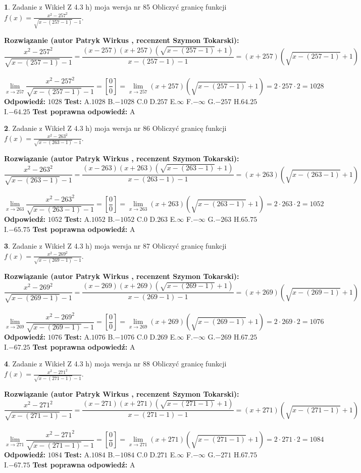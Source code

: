 \documentclass[12pt, a4paper]{article}
\theoremstyle{definition} %
\newtheorem{zad}{}
\newcommand{\zadStart}[1]{\begin{zad}#1\newline}
\newcommand{\zadStop}{\end{zad}}
\newcommand{\rozwStart}[2]{\noindent \textbf{Rozwiązanie (autor #1 , recenzent #2): }\newline}
\newcommand{\rozwStop}{\newline}
\newcommand{\odpStart}{\noindent \textbf{Odpowiedź:}\newline}
\newcommand{\odpStop}{\newline}
\newcommand{\testStart}{\noindent \textbf{Test:}\newline}
\newcommand{\testStop}{\newline}
\newcommand{\kluczStart}{\noindent \textbf{Test poprawna odpowiedź:}\newline}
\newcommand{\kluczStop}{\newline}
\begin{document}
\zadStart{Zadanie z Wikieł Z 4.3 h) moja wersja nr 85}
Obliczyć granicę funkcji $f(x)=\frac{x^{2} - 257^{2}}{\sqrt{x-(257-1)}-1}$.
\zadStop
\rozwStart{Patryk Wirkus}{Szymon Tokarski}
$$\frac{x^{2} - 257^{2}}{\sqrt{x-(257-1)}-1}=\frac{(x-257)(x+257)(\sqrt{x-(257-1)}+1)}{x-(257-1)-1}=(x+257)(\sqrt{x-(257-1)}+1)$$
\\
$$\lim\limits_{x\to 257}\frac{x^{2} - 257^{2}}{\sqrt{x-(257-1)}-1}=[\frac{0}{0}]=
\lim\limits_{x\to 257}(x+257)(\sqrt{x-(257-1)}+1) = 2\cdot257 \cdot 2 = 1028$$
\rozwStop
\odpStart
$1028$
\odpStop
\testStart
A.$1028$
B.$-1028$
C.$0$
D.$257$
E.$\infty$
F.$-\infty$
G.$-257$
H.$64.25$
I.$-64.25$
\testStop
\kluczStart
A
\kluczStop



\zadStart{Zadanie z Wikieł Z 4.3 h) moja wersja nr 86}
Obliczyć granicę funkcji $f(x)=\frac{x^{2} - 263^{2}}{\sqrt{x-(263-1)}-1}$.
\zadStop
\rozwStart{Patryk Wirkus}{Szymon Tokarski}
$$\frac{x^{2} - 263^{2}}{\sqrt{x-(263-1)}-1}=\frac{(x-263)(x+263)(\sqrt{x-(263-1)}+1)}{x-(263-1)-1}=(x+263)(\sqrt{x-(263-1)}+1)$$
\\
$$\lim\limits_{x\to 263}\frac{x^{2} - 263^{2}}{\sqrt{x-(263-1)}-1}=[\frac{0}{0}]=
\lim\limits_{x\to 263}(x+263)(\sqrt{x-(263-1)}+1) = 2\cdot263 \cdot 2 = 1052$$
\rozwStop
\odpStart
$1052$
\odpStop
\testStart
A.$1052$
B.$-1052$
C.$0$
D.$263$
E.$\infty$
F.$-\infty$
G.$-263$
H.$65.75$
I.$-65.75$
\testStop
\kluczStart
A
\kluczStop



\zadStart{Zadanie z Wikieł Z 4.3 h) moja wersja nr 87}
Obliczyć granicę funkcji $f(x)=\frac{x^{2} - 269^{2}}{\sqrt{x-(269-1)}-1}$.
\zadStop
\rozwStart{Patryk Wirkus}{Szymon Tokarski}
$$\frac{x^{2} - 269^{2}}{\sqrt{x-(269-1)}-1}=\frac{(x-269)(x+269)(\sqrt{x-(269-1)}+1)}{x-(269-1)-1}=(x+269)(\sqrt{x-(269-1)}+1)$$
\\
$$\lim\limits_{x\to 269}\frac{x^{2} - 269^{2}}{\sqrt{x-(269-1)}-1}=[\frac{0}{0}]=
\lim\limits_{x\to 269}(x+269)(\sqrt{x-(269-1)}+1) = 2\cdot269 \cdot 2 = 1076$$
\rozwStop
\odpStart
$1076$
\odpStop
\testStart
A.$1076$
B.$-1076$
C.$0$
D.$269$
E.$\infty$
F.$-\infty$
G.$-269$
H.$67.25$
I.$-67.25$
\testStop
\kluczStart
A
\kluczStop



\zadStart{Zadanie z Wikieł Z 4.3 h) moja wersja nr 88}
Obliczyć granicę funkcji $f(x)=\frac{x^{2} - 271^{2}}{\sqrt{x-(271-1)}-1}$.
\zadStop
\rozwStart{Patryk Wirkus}{Szymon Tokarski}
$$\frac{x^{2} - 271^{2}}{\sqrt{x-(271-1)}-1}=\frac{(x-271)(x+271)(\sqrt{x-(271-1)}+1)}{x-(271-1)-1}=(x+271)(\sqrt{x-(271-1)}+1)$$
\\
$$\lim\limits_{x\to 271}\frac{x^{2} - 271^{2}}{\sqrt{x-(271-1)}-1}=[\frac{0}{0}]=
\lim\limits_{x\to 271}(x+271)(\sqrt{x-(271-1)}+1) = 2\cdot271 \cdot 2 = 1084$$
\rozwStop
\odpStart
$1084$
\odpStop
\testStart
A.$1084$
B.$-1084$
C.$0$
D.$271$
E.$\infty$
F.$-\infty$
G.$-271$
H.$67.75$
I.$-67.75$
\testStop
\kluczStart
A
\kluczStop
\end{document}
